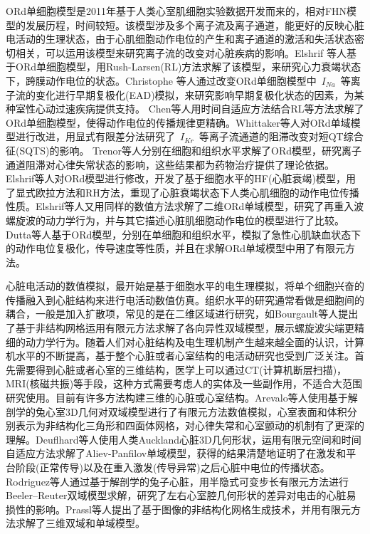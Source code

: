 \documentclass[twoside,UTF8]{nputhesis}
\begin{document}
ORd单细胞模型是2011年基于人类心室肌细胞实验数据开发而来的，相对FHN模型的发展历程，时间较短。该模型涉及多个离子流及离子通道，能更好的反映心脏电活动的生理状态，由于心肌细胞动作电位的产生和离子通道的激活和失活状态密切相关，可以运用该模型来研究离子流的改变对心脏疾病的影响。Elshrif\cite{ovvr2015} 等人基于ORd单细胞模型，用Rush-Larsen(RL)方法求解了该模型，来研究心力衰竭状态下，跨膜动作电位的状态。Christophe\cite{ovvr2013} 等人通过改变ORd单细胞模型中~$I_{Na}$~等离子流的变化进行早期复极化(EAD)模拟，来研究影响早期复极化状态的因素，为某种室性心动过速疾病提供支持。
Chen等人\cite{ord1}用时间自适应方法结合RL等方法求解了ORd单细胞模型，使得动作电位的传播规律更精确。Whittaker等人\cite{ovvr2017}对ORd单域模型进行改进，用显式有限差分法研究了~$I_{Kr}$~等离子流通道的阻滞改变对短QT综合征(SQTS)的影响。
Trenor等人\cite{ovvr2012}分别在细胞和组织水平求解了ORd模型，研究离子通道阻滞对心律失常状态的影响，这些结果都为药物治疗提供了理论依据。
Elshrif等人\cite{ovvr20141}对ORd模型进行修改，开发了基于细胞水平的HF(心脏衰竭)模型，用了显式欧拉方法和RH方法，重现了心脏衰竭状态下人类心肌细胞的动作电位传播性质。Elshrif等人\cite{ovvr20142}又用同样的数值方法求解了二维ORd单域模型，研究了再重入波螺旋波的动力学行为，并与其它描述心脏肌细胞动作电位的模型进行了比较。Dutta等人\cite{ovvr20172}基于ORd模型，分别在单细胞和组织水平，模拟了急性心肌缺血状态下的动作电位复极化，传导速度等性质，并且在求解ORd单域模型中用了有限元方法。

心脏电活动的数值模拟，最开始是基于细胞水平的电生理模拟，将单个细胞兴奋的传播融入到心脏结构来进行电活动数值仿真。组织水平的研究通常看做是细胞间的耦合，一般是加入扩散项，常见的是在二维区域进行研究，如Bourgault\cite{2d2003}等人提出了基于非结构网格运用有限元方法求解了各向异性双域模型，展示螺旋波尖端更精细的动力学行为。随着人们对心脏结构及电生理机制产生越来越全面的认识，计算机水平的不断提高，基于整个心脏或者心室结构的电活动研究也受到广泛关注。首先需要得到心脏或者心室的三维结构，医学上可以通过CT(计算机断层扫描)，MRI(核磁共振)等手段，这种方式需要考虑人的实体及一些副作用，不适合大范围研究使用。目前有许多方法构建三维的心脏或心室结构。Arevalo\cite{3d2007}等人使用基于解剖学的兔心室3D几何对双域模型进行了有限元方法数值模拟，心室表面和体积分别表示为非结构化三角形和四面体网格，对心律失常和心室颤动的机制有了更深的理解。Deuflhard\cite{3d2009}等人使用人类Auckland心脏3D几何形状，运用有限元空间和时间自适应方法求解了Aliev-Panfilov单域模型，获得的结果清楚地证明了在激发和平台阶段(正常传导)以及在重入激发(传导异常)之后心脏中电位的传播状态。Rodriguez\cite{3d2005}等人通过基于解剖学的兔子心脏，用半隐式可变步长有限元方法进行Beeler–Reuter双域模型求解，研究了左右心室腔几何形状的差异对电击的心脏易损性的影响。Prassl\cite{3d20009}等人提出了基于图像的非结构化网格生成技术，并用有限元方法求解了三维双域和单域模型。
\end{document}
